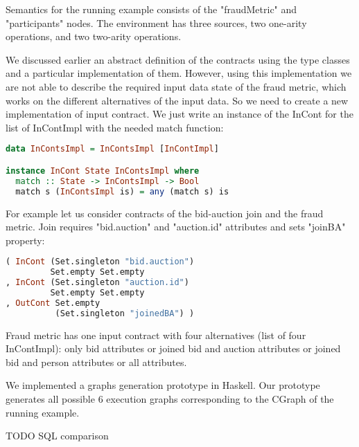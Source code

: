 Semantics for the running example consists of the "fraudMetric" and "participants" nodes.
The environment has three sources, two one-arity operations, and two two-arity operations.

We discussed earlier an abstract definition of the contracts using the type classes and a particular implementation of them. 
However, using this implementation we are not able to describe the required input data state of the fraud metric, which works on the different alternatives of the input data.
So we need to create a new implementation of input contract.
We just write an instance of the InCont for the list of InContImpl with the needed match function:

\begin{lstlisting}[language=Haskell]
data InContsImpl = InContsImpl [InContImpl]

instance InCont State InContsImpl where
  match :: State -> InContsImpl -> Bool
  match s (InContsImpl is) = any (match s) is
\end{lstlisting}

For example let us consider contracts of the bid-auction join and the fraud metric.
Join requires "bid.auction" and "auction.id" attributes and sets "joinBA" property:
\begin{lstlisting}[language=Haskell]
( InCont (Set.singleton "bid.auction")
         Set.empty Set.empty
, InCont (Set.singleton "auction.id")
         Set.empty Set.empty
, OutCont Set.empty
          (Set.singleton "joinedBA") )
\end{lstlisting}

Fraud metric has one input contract with four alternatives (list of four InContImpl):
only bid attributes
or joined bid and auction attributes
or joined bid and person attributes
or all attributes.

We implemented a graphs generation prototype in Haskell.
Our prototype generates all possible 6 execution graphs corresponding to the CGraph of the running example.

TODO SQL comparison
